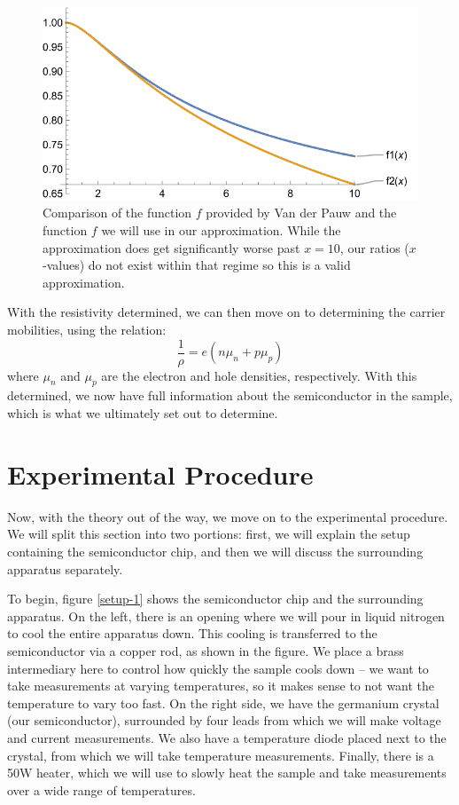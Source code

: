 \documentclass[10pt]{article}
\begin{document}
	\begin{figure}
		\centering
		\includegraphics[scale=0.6]{images/f-graph.png}
		\caption{Comparison of the function \( f \) provided by Van der Pauw and the function \( f \) we will
			use in our approximation. While the approximation does get significantly worse past \( x = 10 \),
		our ratios (\( x \)-values) do not exist within that regime so this is a valid approximation.} 
		\label{vdp-compare}
	\end{figure}
	
	With the resistivity determined, we can then move on to determining the carrier mobilities, using the
	relation:
	\begin{equation}
		\label{mobility}
		\frac{1}{\rho} = e \left( n \mu_n + p \mu_p \right)
	\end{equation} 
	where \( \mu_n \) and \( \mu_p \) are the electron and hole densities, respectively. With this
	determined, we now have full information about the semiconductor in the sample, which is what we
	ultimately set out to determine.   

	\section{Experimental Procedure}
	Now, with the theory out of the way, we move on to the experimental procedure. We will split this section
	into two portions: first, we will explain the setup containing the semiconductor chip, and then we will
	discuss the surrounding apparatus separately. 

	To begin, figure \ref{setup-1} shows the semiconductor chip and the surrounding apparatus. On the left, there is
	an opening where we will pour in liquid nitrogen to cool the entire apparatus down. This cooling is
	transferred to the semiconductor via a copper rod, as shown in the figure. We place a brass intermediary
	here to control how quickly the sample cools down -- we want to take measurements at varying
	temperatures, so it makes sense to not want the temperature to vary too fast. On the right side, we have
	the germanium crystal (our semiconductor), surrounded by four leads from which we will make voltage and
	current measurements. We also have a temperature diode placed next to the crystal, from which we will
	take temperature measurements. Finally, there is a 50W heater, which we will use to slowly heat the
	sample and take measurements over a wide range of temperatures.        
\end{document}
